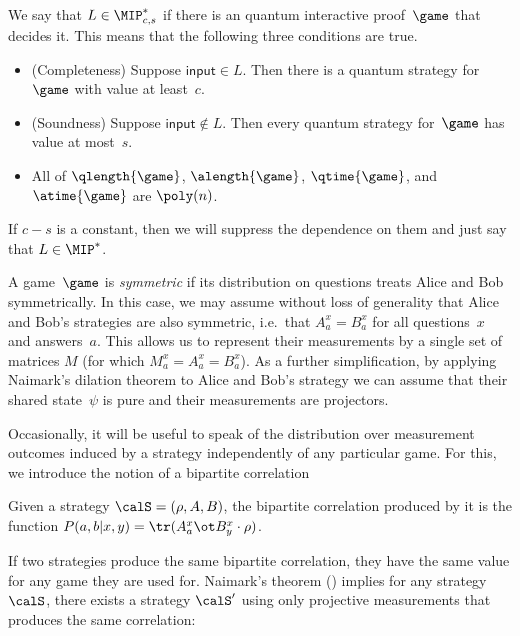 \begin{definition}
We say that $L \in \MIP_{c, s}^*$ if there is an quantum interactive proof~$\game$ that decides it.
This means that the following three conditions are true.
\begin{itemize}
\item[$\circ$] (Completeness) Suppose $\mathsf{input} \in L$.  Then there is a quantum strategy for~$\game$ with value at least~$c$.
\item[$\circ$] (Soundness) Suppose $\mathsf{input} \notin L$.  Then every quantum strategy for~$\game$ has value at most~$s$.
\item[$\circ$] All of $\qlength{\game}$, $\alength{\game}$, $\qtime{\game}$, and $\atime{\game}$ are $\poly(n)$.
\end{itemize}
If $c - s$ is a constant, then we will suppress the dependence on them and just say that $L \in \MIP^*$.
\end{definition}

\begin{remark}
A game~$\game$ is \emph{symmetric} if its distribution on questions treats Alice and Bob symmetrically.
In this case, we may assume without loss of generality that Alice and Bob's strategies are also symmetric,
i.e.\ that $A_a^x = B_a^x$ for all questions~$x$ and answers~$a$.
This allows us to represent their measurements by a single set of matrices $M$ (for which $M_a^x = A_a^x = B_a^x$).
As a further simplification, by applying Naimark's dilation theorem to Alice and Bob's strategy 
we can assume that their shared state~$\psi$ is pure and their measurements are projectors.
\end{remark}

Occasionally, it will be useful to speak of the distribution over
measurement outcomes induced by a strategy independently of any
particular game. For this, we introduce the notion of a bipartite correlation
\begin{definition}
  Given a strategy $\calS = (\rho, A, B)$, the bipartite correlation produced by it is
  the function $P(a, b | x, y) = \tr(A^x_a \ot B^x_y \cdot \rho)$.
\end{definition}
If two strategies produce the same bipartite correlation, they have
the same value for any game they are used for. Naimark's theorem
() implies for any strategy $\calS$, there exists a
strategy $\calS'$ using only projective measurements that produces the
same correlation:

